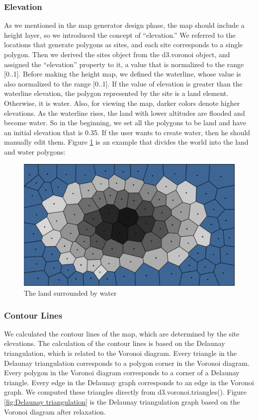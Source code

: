 \subsubsection{Elevation}
As we mentioned in the map generator design phase, the map should include a height layer, so we introduced the concept of ``elevation.'' We referred to the locations that generate polygons as sites, and each site corresponds to a single polygon. Then we derived the sites object from the d3.voronoi object, and assigned the ``elevation'' property to it, a value that is normalized to the range [0..1]. Before making the height map, we defined the waterline, whose value is also normalized to the range [0..1]. If the value of elevation is greater than the waterline elevation, the polygon represented by the site is a land element. Otherwise, it is water. Also, for viewing the map, darker colors denote higher elevations. As the waterline rises, the land with lower altitudes are flooded and become water. So in the beginning, we set all the polygons to be land and have an initial elevation that is 0.35. If the user wants to create water, then he should manually edit them. Figure \ref{fig:Height Map} is an example that divides the world into the land and water polygons:

\begin{figure}[htbp]
  \centering
  \includegraphics[width=\textwidth]{section04/assets/Map-heightmap.png}
  \caption{The land surrounded by water}
  \label{fig:Height Map}
\end{figure}

\subsubsection{Contour Lines}
We calculated the contour lines of the map, which are determined by the site elevations. The calculation of the contour lines is based on the Delaunay triangulation, which is related to the Voronoi diagram. Every triangle in the Delaunay triangulation corresponds to a polygon corner in the Voronoi diagram. Every polygon in the Voronoi diagram corresponds to a corner of a Delaunay triangle. Every edge in the Delaunay graph corresponds to an edge in the Voronoi graph. We computed these triangles directly from d3.voronoi.triangles(). Figure \ref{fig:Delaunay triangulation} is the Delaunay triangulation graph based on the Voronoi diagram after relaxation.

